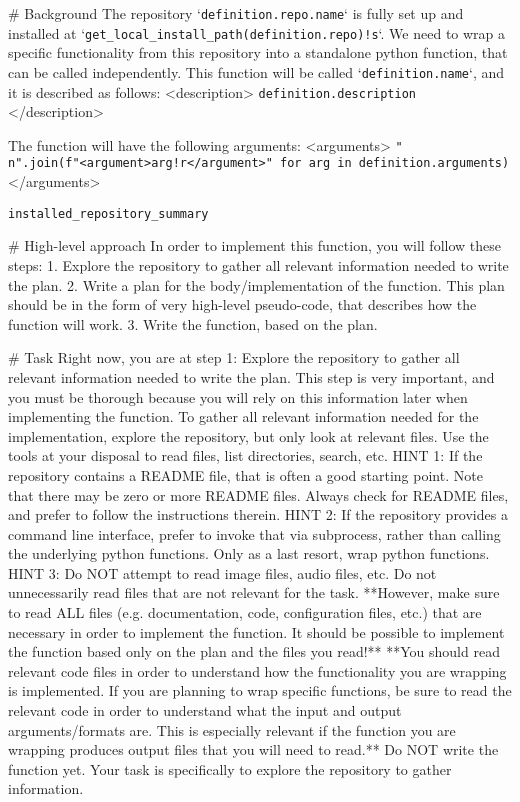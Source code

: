 \begin{tcolorbox}[title={\texttt{Explore Repository User Instructions}}]
\# Background
The repository `\texttt{{definition.repo.name}}` is fully set up and installed at `\texttt{{get\_local\_install\_path(definition.repo)!s}}`.
We need to wrap a specific functionality from this repository into a standalone python function, that can be called independently. 
This function will be called `\texttt{{definition.name}}`, and it is described as follows:
<description>
\texttt{{definition.description}}
</description>

The function will have the following arguments:
<arguments>
\texttt{{"\\n".join(f"<argument>{arg!r}</argument>" for arg in definition.arguments)}}
</arguments>

\texttt{{installed\_repository\_summary}}

\# High-level approach
In order to implement this function, you will follow these steps:
1. Explore the repository to gather all relevant information needed to write the plan.
2. Write a plan for the body/implementation of the function. This plan should be in the form of very high-level pseudo-code, that describes how the function will work.
3. Write the function, based on the plan.

\# Task
Right now, you are at step 1: Explore the repository to gather all relevant information needed to write the plan.
This step is very important, and you must be thorough because you will rely on this information later when implementing the function.
To gather all relevant information needed for the implementation, explore the repository, but only look at relevant files.
Use the tools at your disposal to read files, list directories, search, etc.
HINT 1: If the repository contains a README file, that is often a good starting point. Note that there may be zero or more README files. Always check for README files, and prefer to follow the instructions therein.
HINT 2: If the repository provides a command line interface, prefer to invoke that via subprocess, rather than calling the underlying python functions. Only as a last resort, wrap python functions.
HINT 3: Do NOT attempt to read image files, audio files, etc.
Do not unnecessarily read files that are not relevant for the task.
**However, make sure to read ALL files (e.g. documentation, code, configuration files, etc.) that are necessary in order to implement the function. It should be possible to implement the function based only on the plan and the files you read!**
**You should read relevant code files in order to understand how the functionality you are wrapping is implemented. If you are planning to wrap specific functions, be sure to read the relevant code in order to understand what the input and output arguments/formats are. This is especially relevant if the function you are wrapping produces output files that you will need to read.**
Do NOT write the function yet.
Your task is specifically to explore the repository to gather information.


\end{tcolorbox}
